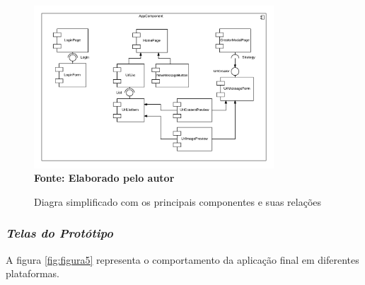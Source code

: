 \begin{figure}[ht]
	\centering	
	\caption[\hspace{0.1cm}Diagra simplificado com os principais componentes e suas relações.]{Diagra simplificado com os principais componentes e suas relações}
	\vspace{-0.4cm}
	\includegraphics[width=0.8\textwidth]{figuras/Components.png}
	\vspace{-0.2cm}
	\\\textbf{\footnotesize Fonte: Elaborado pelo autor }
	\label{fig:figura4}
\end{figure}


\subsubsection{{\it Telas do Protótipo}}
A figura \ref{fig:figura5} representa o comportamento da aplicação final em diferentes plataformas.

